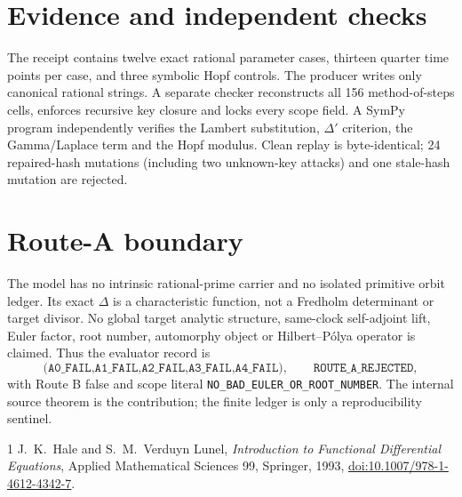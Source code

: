 \documentclass[11pt]{article}
\begin{document}
\section{Evidence and independent checks}
The receipt contains twelve exact rational parameter cases, thirteen quarter
time points per case, and three symbolic Hopf controls.  The producer writes
only canonical rational strings.  A separate checker reconstructs all 156
method-of-steps cells, enforces recursive key closure and locks every scope
field.  A SymPy program independently verifies the Lambert substitution,
$\Delta'$ criterion, the Gamma/Laplace term and the Hopf modulus.  Clean
replay is byte-identical; 24 repaired-hash mutations (including two
unknown-key attacks) and one stale-hash mutation are rejected.

\section{Route-A boundary}
The model has no intrinsic rational-prime carrier and no isolated primitive
orbit ledger.  Its exact $\Delta$ is a characteristic function, not a
Fredholm determinant or target divisor.  No global target analytic structure,
same-clock self-adjoint lift, Euler factor, root number, automorphy object or
Hilbert--Pólya operator is claimed.  Thus the evaluator record is
\[
\texttt{(A0\_FAIL,A1\_FAIL,A2\_FAIL,A3\_FAIL,A4\_FAIL)},
\qquad \texttt{ROUTE\_A\_REJECTED},
\]
with Route B false and scope literal
\texttt{NO\_BAD\_EULER\_OR\_ROOT\_NUMBER}.  The internal source theorem is the
contribution; the finite ledger is only a reproducibility sentinel.

\begin{thebibliography}{1}
J.~K.~Hale and S.~M.~Verduyn Lunel,
\emph{Introduction to Functional Differential Equations},
Applied Mathematical Sciences 99, Springer, 1993,
\href{https://doi.org/10.1007/978-1-4612-4342-7}{doi:10.1007/978-1-4612-4342-7}.
\end{thebibliography}
\end{document}
